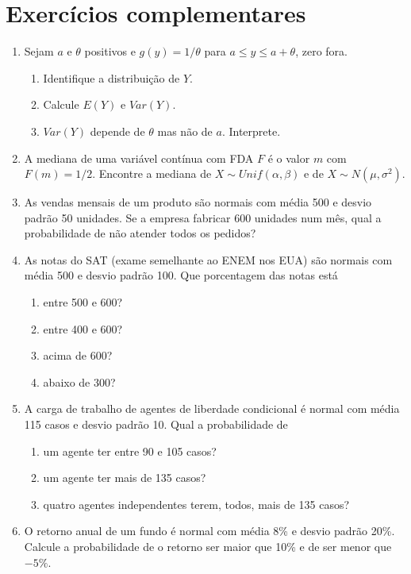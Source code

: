 \documentclass[11pt]{article}
\begin{document}
\bigskip
\section*{Exercícios complementares}

\begin{enumerate}[label=\textbf{C\arabic*.}, leftmargin=*]
\item Sejam $a$ e $\theta$ positivos e $g(y) = 1/\theta$ para $a \leq y \leq a + \theta$, zero fora.
\begin{enumerate}[label=(\alph*)]
  \item Identifique a distribuição de $Y$.
  \item Calcule $E(Y)$ e $Var(Y)$.
  \item $Var(Y)$ depende de $\theta$ mas não de $a$. Interprete.
\end{enumerate}
\item A mediana de uma variável contínua com FDA $F$ é o valor $m$ com $F(m) = 1/2$. Encontre a mediana de $X \sim Unif(\alpha, \beta)$ e de $X \sim N(\mu, \sigma^2)$.
\item As vendas mensais de um produto são normais com média 500 e desvio padrão 50 unidades. Se a empresa fabricar 600 unidades num mês, qual a probabilidade de não atender todos os pedidos?
\item As notas do SAT (exame semelhante ao ENEM nos EUA) são normais com média 500 e desvio padrão 100. Que porcentagem das notas está
\begin{enumerate}[label=(\alph*)]
  \item entre 500 e 600?
  \item entre 400 e 600?
  \item acima de 600?
  \item abaixo de 300?
\end{enumerate}
\item A carga de trabalho de agentes de liberdade condicional é normal com média 115 casos e desvio padrão 10. Qual a probabilidade de
\begin{enumerate}[label=(\alph*)]
  \item um agente ter entre 90 e 105 casos?
  \item um agente ter mais de 135 casos?
  \item quatro agentes independentes terem, todos, mais de 135 casos?
\end{enumerate}
\item O retorno anual de um fundo é normal com média 8\% e desvio padrão 20\%. Calcule a probabilidade de o retorno ser maior que 10\% e de ser menor que $-5\%$.

\end{enumerate}
\end{document}
